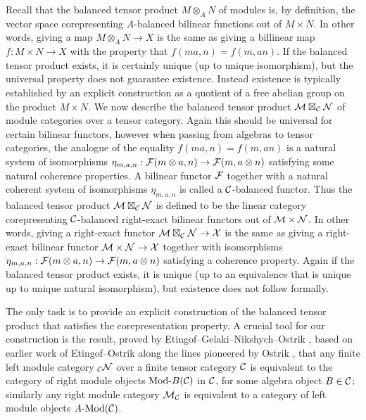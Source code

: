 \documentclass{amsart}
\begin{document}
Recall that the balanced tensor product $M \otimes_A N$ of modules is, by definition, the vector space corepresenting $A$-balanced bilinear functions out of $M \times N$.  In other words, giving a map $M \otimes_A N \rightarrow X$ is the same as giving a billinear map $f: M \times N \rightarrow X$ with the property that $f(ma,n) = f(m, an)$.  If the balanced tensor product exists, it is certainly unique (up to unique isomorphism), but the universal property does not guarantee existence.  Instead existence is typically established by an explicit construction as a quotient of a free abelian group on the product $M \times N$. We now describe the balanced tensor product $\mathcal M \boxtimes_{\mathcal C} \mathcal N$ of module categories over a tensor category.  Again this should be universal for certain bilinear functors, however when passing from algebras to tensor categories, the analogue of the equality $f(ma,n) = f(m, an)$ is a natural system of isomorphisms $\eta_{m,a,n}: \mathcal F(m \otimes a,n) \rightarrow \mathcal F(m, a \otimes n)$ satisfying some natural coherence properties.  A bilinear functor $\mathcal F$ together with a natural coherent system of isomorphisms $\eta_{m,a,n}$ is called a $\mathcal C$-balanced functor.  Thus the balanced tensor product $\mathcal M \boxtimes_{\mathcal C} \mathcal N$ is defined to be the linear category corepresenting $\mathcal C$-balanced right-exact bilinear functors out of $\mathcal M \times \mathcal N$. In other words, giving a right-exact functor $\mathcal M \boxtimes_{\mathcal C} \mathcal N \rightarrow \mathcal X$ is the same as giving a right-exact bilinear functor $\mathcal M \times \mathcal N \rightarrow \mathcal X$ together with isomorphisms $\eta_{m,a,n}: \mathcal F(m \otimes a,n) \rightarrow \mathcal F(m, a \otimes n)$ satisfying a coherence property.  Again if the balanced tensor product exists, it is unique (up to an equivalence that is unique up to unique natural isomorphism), but existence does not follow formally. 

The only task is to provide an explicit construction of the balanced tensor product that satisfies the corepresentation property.  A crucial tool for our construction is the result, proved by Etingof--Gelaki--Nikshych--Ostrik \cite[Thm 2.11.6]{EGNO}, based on earlier work of Etingof--Ostrik \cite[\S 3.2]{EO-ftc} along the lines pioneered by Ostrik \cite[Thm 1]{MR1976459}, that any finite left module category ${}_{\mathcal C} \mathcal N$ over a finite tensor category $\mathcal C$ is equivalent to the category of right module objects $\Mod{}{B}(\cC)$ in $\mathcal C$, for some algebra object $B \in \mathcal C$; similarly any right module category $\mathcal M_{\mathcal C}$ is equivalent to a category of left module objects $\Mod{A}{}(\cC)$.  
\end{document}
